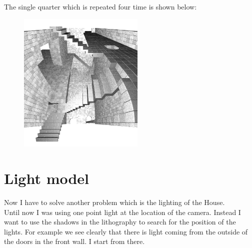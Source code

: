 \documentclass[12pt, a4paper]{article}
\begin{document}
The single quarter which is repeated four time is shown below:\\

\begin{center}
\begin{figure}[H]
\centering
\includegraphics[width=6cm]{./quarter.png}\\
\end{figure}
\end{center}

\section{Light model}

Now I have to solve another problem which is the lighting of the House.\\

Until now I was using one point light at the location of the camera. Instead I want to use the shadows in the lithography to search for the position of the lights. For example we see clearly that there is light coming from the outside of the doors in the front wall. I start from there.\\
\end{document}
